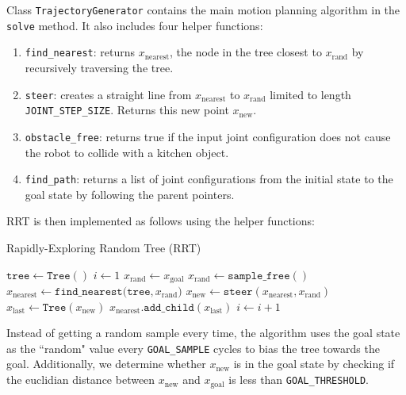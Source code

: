 \documentclass{article}
\begin{document}
Class \texttt{TrajectoryGenerator} contains the main motion planning algorithm in the \texttt{solve} method. It also includes four helper functions:
\begin{enumerate}
    \item \texttt{find\_nearest}: returns $x_\text{nearest}$, the node in the tree closest to $x_\text{rand}$ by recursively traversing the tree.
    \item \texttt{steer}: creates a straight line from $x_\text{nearest}$ to $x_\text{rand}$ limited to length \texttt{JOINT\_STEP\_SIZE}. Returns this new point $x_\text{new}$.
    \item \texttt{obstacle\_free}: returns true if the input joint configuration does not cause the robot to collide with a kitchen object.
    \item \texttt{find\_path}: returns a list of joint configurations from the initial state to the goal state by following the parent pointers.
\end{enumerate}

RRT is then implemented as follows using the helper functions:
\begin{algorithm}
\caption{Rapidly-Exploring Random Tree (RRT)}\label{alg:rrt}
\begin{algorithmic}
\State $\mathtt{tree} \gets \mathtt{Tree()}$
\State $i \gets 1$
        \State $x_\text{rand} \gets x_\text{goal}$
    \Else
        \State $x_\text{rand} \gets \mathtt{sample\_free()}$
    \EndIf
    \State $x_\text{nearest} \gets \mathtt{find\_nearest(tree}, x_\text{rand})$
    \State $x_\text{new} \gets \mathtt{steer}(x_\text{nearest}, x_\text{rand})$
    \State $x_\text{last} \gets \mathtt{Tree}(x_\text{new})$
        \State $x_\text{nearest}\mathtt{.add\_child}(x_\text{last})$
            \State {}
        \EndIf 
        \State $i \gets i + 1$
    \EndIf 
\EndWhile
\end{algorithmic}
\end{algorithm}

Instead of getting a random sample every time, the algorithm uses the goal state as the ``random" value every \texttt{GOAL\_SAMPLE} cycles to bias the tree towards the goal. Additionally, we determine whether $x_\text{new}$ is in the goal state by checking if the euclidian distance between $x_\text{new}$ and $x_\text{goal}$ is less than \texttt{GOAL\_THRESHOLD}. 
\end{document}
